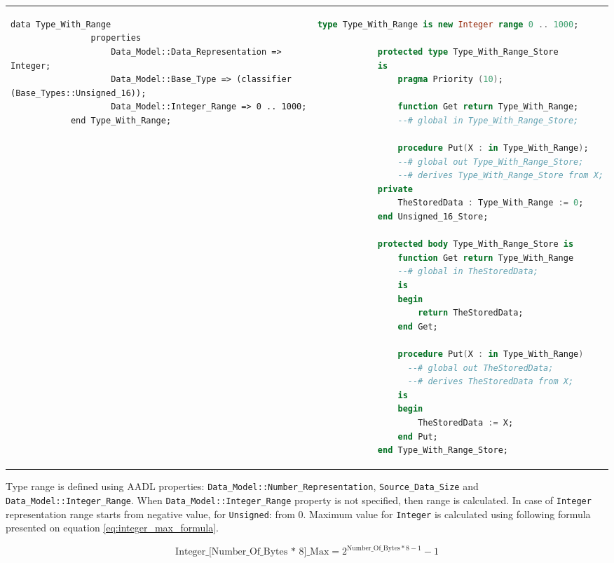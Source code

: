 \begin{center}
\begin{longtable}{| p{2in} | p{4in} |}
		\\ \hline

		\begin{lstlisting}[language=aadl]
			data Type_With_Range
				properties
					Data_Model::Data_Representation => Integer;
					Data_Model::Base_Type => (classifier (Base_Types::Unsigned_16));
					Data_Model::Integer_Range => 0 .. 1000;
			end Type_With_Range;
		\end{lstlisting} 
		&
		\begin{lstlisting}[language=ada]
			type Type_With_Range is new Integer range 0 .. 1000;
    
		    protected type Type_With_Range_Store
		    is
		        pragma Priority (10);

		        function Get return Type_With_Range;
		        --# global in Type_With_Range_Store;

		        procedure Put(X : in Type_With_Range);
		        --# global out Type_With_Range_Store;
		        --# derives Type_With_Range_Store from X;
		    private
		        TheStoredData : Type_With_Range := 0;
		    end Unsigned_16_Store;

		    protected body Type_With_Range_Store is
		        function Get return Type_With_Range
		        --# global in TheStoredData;
		        is
		        begin
		            return TheStoredData;
		        end Get;

		        procedure Put(X : in Type_With_Range)
		          --# global out TheStoredData;
		          --# derives TheStoredData from X;
		        is
		        begin
		            TheStoredData := X;
		        end Put;
		    end Type_With_Range_Store;

		\end{lstlisting}
	\end{longtable}
\end{center}
\doublespacing

Type range is defined using AADL properties: \lstinline{Data_Model::Number_Representation}, \lstinline{Source_Data_Size} and \lstinline{Data_Model::Integer_Range}. When \lstinline{Data_Model::Integer_Range} property is not specified, then range is calculated. In case of \lstinline{Integer} representation range starts from negative value, for \lstinline{Unsigned}: from 0. Maximum value for \lstinline{Integer} is calculated using following formula presented on equation \ref{eq:integer_max_formula}. 

\begin{equation} \label{eq:integer_max_formula}
	\text{Integer\_[Number\_Of\_Bytes * 8]\_Max} = 2^{\text{Number\_Of\_Bytes} * 8 - 1} - 1
\end{equation}

